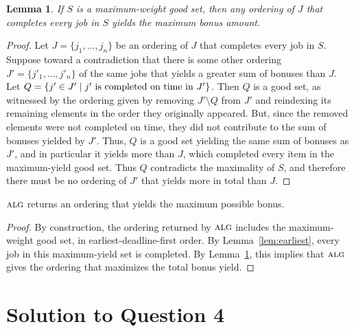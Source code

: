 \documentclass[11pt]{article}
\newcommand{\alg}{\textsc{alg}}
\newtheorem{lemma}[theorem]{Lemma}
\begin{document}
\begin{lemma}\label{lem:max-good-set}
  If $S$ is a maximum-weight good set, then any ordering of $J$ that completes every job in $S$ yields the maximum bonus amount.
\end{lemma}
\begin{proof}
  Let $J = \{j_1, \dots, j_n\}$ be an ordering of $J$ that completes every job in $S$.
  Suppose toward a contradiction that there is some other ordering $J' = \{j'_1, \dots, j'_n\}$ of the same jobs that yields a greater sum of bonuses than $J$.
  Let $Q = \{j' \in J' \mid j' \textnormal{ is completed on time in } J'\}$.
  Then $Q$ is a good set, as witnessed by the ordering given by removing $J' \setminus Q$ from $J'$ and reindexing its remaining elements in the order they originally appeared.
  But, since the removed elements were not completed on time, they did not contribute to the sum of bonuses yielded by $J'$.
  Thus, $Q$ is a good set yielding the same sum of bonuses as $J'$, and in particular it yields more than $J$, which completed every item in the maximum-yield good set.
  Thus $Q$ contradicts the maximality of $S$, and therefore there must be no ordering of $J'$ that yields more in total than $J$.
\end{proof}

 $\alg$ returns an ordering that yields the maximum possible bonus.
\begin{proof}
  By construction, the ordering returned by $\alg$ includes the maximum-weight good set, in earliest-deadline-first order.
  By Lemma~\ref{lem:earliest}, every job in this maximum-yield set is completed.
  By Lemma~\ref{lem:max-good-set}, this implies that $\alg$ gives the ordering that maximizes the total bonus yield.
\end{proof}

\section{Solution to Question 4}
\end{document}
